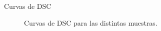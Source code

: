 \documentclass[11pt]{beamer}
\begin{document}
\begin{frame}{Curvas de DSC}
\begin{figure}[H]
{					}
				\caption*{Curvas de DSC para las distintas muestras.}
			\end{figure}	
		\end{frame}
\end{document}
